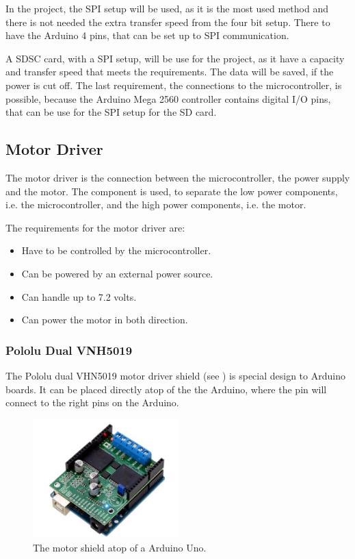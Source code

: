 In the project, the SPI setup will be used, as it is the most used method and there is not needed the extra transfer speed from the four bit setup. There to have the Arduino 4 pins, that can be set up to SPI communication.


A SDSC card, with a SPI setup, will be use for the project, as it have a capacity and transfer speed that meets the requirements. The data will be saved, if the power is cut off. The last requirement, the connections to the microcontroller, is possible, because the Arduino Mega 2560 controller contains digital I/O pins, that can be use for the SPI setup for the SD card.


\subsection{Motor Driver}
The motor driver is the connection between the microcontroller, the power supply and the motor. The component is used, to separate the low power components, i.e. the microcontroller, and the high power components, i.e. the motor.

The requirements for the motor driver are:
\begin{itemize}
\item Have to be controlled by the microcontroller.
\item Can be powered by an external power source.
\item Can handle up to 7.2 volts.
\item Can power the motor in both direction.
\end{itemize}

\subsubsection{Pololu Dual VNH5019}
The Pololu dual VHN5019 motor driver shield (see ) is special design to Arduino boards. It can be placed directly atop of the the Arduino, where the pin will connect to the right pins on the Arduino. 

\begin{figure}[H]
	\centering
	\includegraphics[width=0.50\textwidth]{figures/Motordriver}
		\caption{The motor shield atop of a Arduino Uno.} 
	\label{MotorDrive}
\end{figure}

